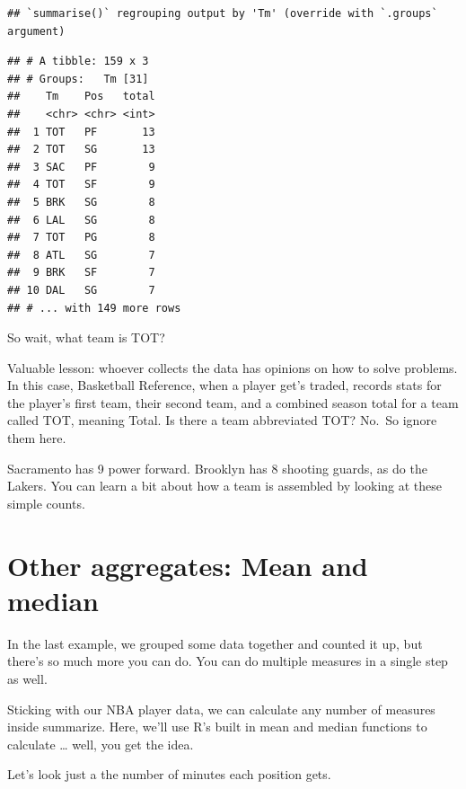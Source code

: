 \documentclass[
]{book}
\newenvironment{Shaded}{\begin{snugshade}}{\end{snugshade}}
\newcommand{\DataTypeTok}[1]{\textcolor[rgb]{0.13,0.29,0.53}{#1}}
\newcommand{\KeywordTok}[1]{\textcolor[rgb]{0.13,0.29,0.53}{\textbf{#1}}}
\newcommand{\NormalTok}[1]{#1}
\newcommand{\OperatorTok}[1]{\textcolor[rgb]{0.81,0.36,0.00}{\textbf{#1}}}
\newcommand{\StringTok}[1]{\textcolor[rgb]{0.31,0.60,0.02}{#1}}
\begin{document}
\begin{verbatim}
## `summarise()` regrouping output by 'Tm' (override with `.groups` argument)
\end{verbatim}

\begin{verbatim}
## # A tibble: 159 x 3
## # Groups:   Tm [31]
##    Tm    Pos   total
##    <chr> <chr> <int>
##  1 TOT   PF       13
##  2 TOT   SG       13
##  3 SAC   PF        9
##  4 TOT   SF        9
##  5 BRK   SG        8
##  6 LAL   SG        8
##  7 TOT   PG        8
##  8 ATL   SG        7
##  9 BRK   SF        7
## 10 DAL   SG        7
## # ... with 149 more rows
\end{verbatim}

So wait, what team is TOT?

Valuable lesson: whoever collects the data has opinions on how to solve problems. In this case, Basketball Reference, when a player get's traded, records stats for the player's first team, their second team, and a combined season total for a team called TOT, meaning Total. Is there a team abbreviated TOT? No.~So ignore them here.

Sacramento has 9 power forward. Brooklyn has 8 shooting guards, as do the Lakers. You can learn a bit about how a team is assembled by looking at these simple counts.

\hypertarget{other-aggregates-mean-and-median}{%
\section{Other aggregates: Mean and median}\label{other-aggregates-mean-and-median}}

In the last example, we grouped some data together and counted it up, but there's so much more you can do. You can do multiple measures in a single step as well.

Sticking with our NBA player data, we can calculate any number of measures inside summarize. Here, we'll use R's built in mean and median functions to calculate \ldots{} well, you get the idea.

Let's look just a the number of minutes each position gets.

\begin{Shaded}
\end{Shaded}
\end{document}
